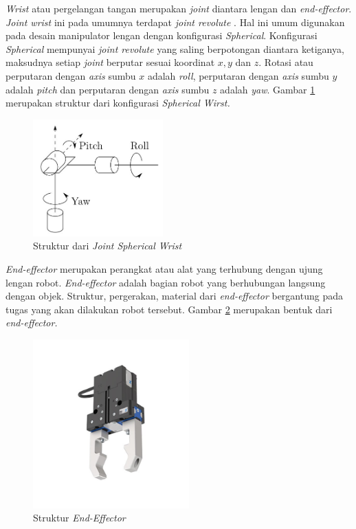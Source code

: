 \textit{Wrist} atau pergelangan tangan merupakan \textit{joint} diantara lengan dan \textit{end-effector}. \textit{Joint wrist} ini pada umumnya terdapat \textit{joint revolute} . Hal ini umum digunakan pada desain manipulator lengan dengan konfigurasi \textit{Spherical}. Konfigurasi \textit{Spherical} mempunyai \textit{joint revolute} yang saling berpotongan diantara ketiganya, maksudnya setiap \textit{joint} berputar sesuai koordinat $x, y $ dan $z$. Rotasi atau perputaran dengan \textit{axis} sumbu $x$ adalah \textit{roll}, perputaran dengan \textit{axis} sumbu $y$ adalah \textit{pitch} dan perputaran dengan \textit{axis} sumbu $z$ adalah \textit{yaw}. Gambar \ref{pic.sphericalwirst} merupakan struktur dari konfigurasi \textit{Spherical Wirst.}
	\begin{figure}[H]
	\centering
	\includegraphics[width=5cm]{gambar/wirst.jpg}
	\caption{Struktur dari \textit{Joint Spherical Wrist}}
	\label{pic.sphericalwirst}
\end{figure}


\textit{End-effector} merupakan perangkat atau alat yang terhubung dengan ujung lengan robot. \textit{End-effector} adalah bagian robot yang berhubungan langsung dengan objek. Struktur, pergerakan, material dari \textit{end-effector} bergantung pada tugas yang akan dilakukan robot tersebut. Gambar \ref{pic.endeffector} merupakan bentuk dari \textit{end-effector.}
	\begin{figure}[H]
	\centering
	\includegraphics[width=6cm]{gambar/end_effector.jpg}
	\caption{Struktur \textit{End-Effector}}
	\label{pic.endeffector}
	\end{figure}


